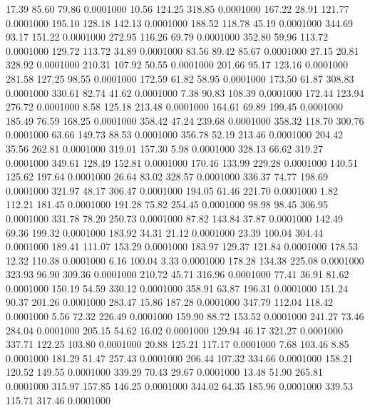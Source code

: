   17.39   85.60   79.86   0.0001000
  10.56  124.25  318.85   0.0001000
 167.22   28.91  121.77   0.0001000
 195.10  128.18  142.13   0.0001000
 188.52  118.78   45.19   0.0001000
 344.69   93.17  151.22   0.0001000
 272.95  116.26   69.79   0.0001000
 352.80   59.96  113.72   0.0001000
 129.72  113.72   34.89   0.0001000
  83.56   89.42   85.67   0.0001000
  27.15   20.81  328.92   0.0001000
 210.31  107.92   50.55   0.0001000
 201.66   95.17  123.16   0.0001000
 281.58  127.25   98.55   0.0001000
 172.59   61.82   58.95   0.0001000
 173.50   61.87  308.83   0.0001000
 330.61   82.74   41.62   0.0001000
   7.38   90.83  108.39   0.0001000
 172.44  123.94  276.72   0.0001000
   8.58  125.18  213.48   0.0001000
 164.61   69.89  199.45   0.0001000
 185.49   76.59  168.25   0.0001000
 358.42   47.24  239.68   0.0001000
 358.32  118.70  300.76   0.0001000
  63.66  149.73   88.53   0.0001000
 356.78   52.19  213.46   0.0001000
 204.42   35.56  262.81   0.0001000
 319.01  157.30    5.98   0.0001000
 328.13   66.62  319.27   0.0001000
 349.61  128.49  152.81   0.0001000
 170.46  133.99  229.28   0.0001000
 140.51  125.62  197.64   0.0001000
  26.64   83.02  328.57   0.0001000
 336.37   74.77  198.69   0.0001000
 321.97   48.17  306.47   0.0001000
 194.05   61.46  221.70   0.0001000
   1.82  112.21  181.45   0.0001000
 191.28   75.82  254.45   0.0001000
  98.98   98.45  306.95   0.0001000
 331.78   78.20  250.73   0.0001000
  87.82  143.84   37.87   0.0001000
 142.49   69.36  199.32   0.0001000
 183.92   34.31   21.12   0.0001000
  23.39  100.04  304.44   0.0001000
 189.41  111.07  153.29   0.0001000
 183.97  129.37  121.84   0.0001000
 178.53   12.32  110.38   0.0001000
   6.16  100.04    3.33   0.0001000
 178.28  134.38  225.08   0.0001000
 323.93   96.90  309.36   0.0001000
 210.72   45.71  316.96   0.0001000
  77.41   36.91   81.62   0.0001000
 150.19   54.59  330.12   0.0001000
 358.91   63.87  196.31   0.0001000
 151.24   90.37  201.26   0.0001000
 283.47   15.86  187.28   0.0001000
 347.79  112.04  118.42   0.0001000
   5.56   72.32  226.49   0.0001000
 159.90   88.72  153.52   0.0001000
 241.27   73.46  284.04   0.0001000
 205.15   54.62   16.02   0.0001000
 129.94   46.17  321.27   0.0001000
 337.71  122.25  103.80   0.0001000
  20.88  125.21  117.17   0.0001000
   7.68  103.46    8.85   0.0001000
 181.29   51.47  257.43   0.0001000
 206.44  107.32  334.66   0.0001000
 158.21  120.52  149.55   0.0001000
 339.29   70.43   29.67   0.0001000
  13.48   51.90  265.81   0.0001000
 315.97  157.85  146.25   0.0001000
 344.02   64.35  185.96   0.0001000
 339.53  115.71  317.46   0.0001000
